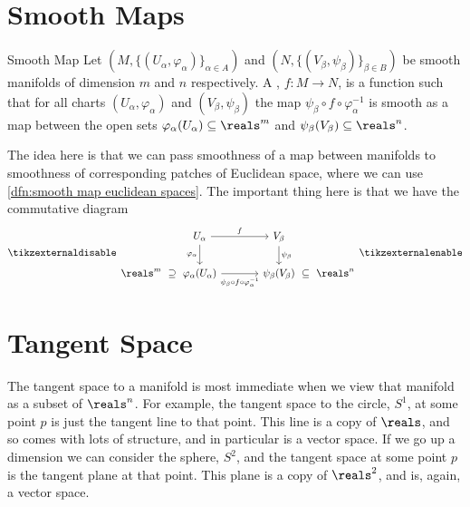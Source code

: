 \documentclass[fleqn]{NotesClass}
\begin{document}
    \section{Smooth Maps}
    \begin{dfn}{Smooth Map}{}
        Let \((M, \{(U_\alpha, \varphi_\alpha)\}_{\alpha \in A})\) and \((N, \{(V_\beta, \psi_\beta)\}_{\beta \in B})\) be smooth manifolds of dimension \(m\) and \(n\) respectively.
        A , \(f \colon M \to N\), is a function such that for all charts \((U_\alpha, \varphi_\alpha)\) and \((V_\beta, \psi_\beta)\) the map \(\psi_\beta \circ f \circ \varphi_\alpha^{-1}\) is smooth as a map between the open sets \(\varphi_\alpha(U_\alpha) \subseteq \reals^m\) and \(\psi_\beta(V_\beta) \subseteq \reals^n\).
    \end{dfn}
    
    The idea here is that we can pass smoothness of a map between manifolds to smoothness of corresponding patches of Euclidean space, where we can use \cref{dfn:smooth map euclidean spaces}.
    The important thing here is that we have the commutative diagram
    \begin{equation}
        \tikzexternaldisable
        \begin{tikzcd}[column sep=small]
            & U_\alpha \arrow[rrr, "f"] \arrow[d, "\varphi_\alpha"'] &&& V_\beta \arrow[d, "\psi_\beta"]\\
            \reals^m \arrow[r, phantom, "\supseteq"] & \varphi_\alpha(U_\alpha) \arrow[rrr, "\psi_\beta \circ f \circ \varphi_\alpha^{-1}"'{yshift=-0.05cm}] &&& \psi_\beta(V_\beta) \arrow[r, phantom, "\subseteq"] & \reals^n
        \end{tikzcd}
        \tikzexternalenable
    \end{equation}
    
    \section{Tangent Space}
    The tangent space to a manifold is most immediate when we view that manifold as a subset of \(\reals^n\).
    For example, the tangent space to the circle, \(S^1\), at some point \(p\) is just the tangent line to that point.
    This line is a copy of \(\reals\), and so comes with lots of structure, and in particular is a vector space.
    If we go up a dimension we can consider the sphere, \(S^2\), and the tangent space at some point \(p\) is the tangent plane at that point.
    This plane is a copy of \(\reals^2\), and is, again, a vector space.
    
\end{document}
